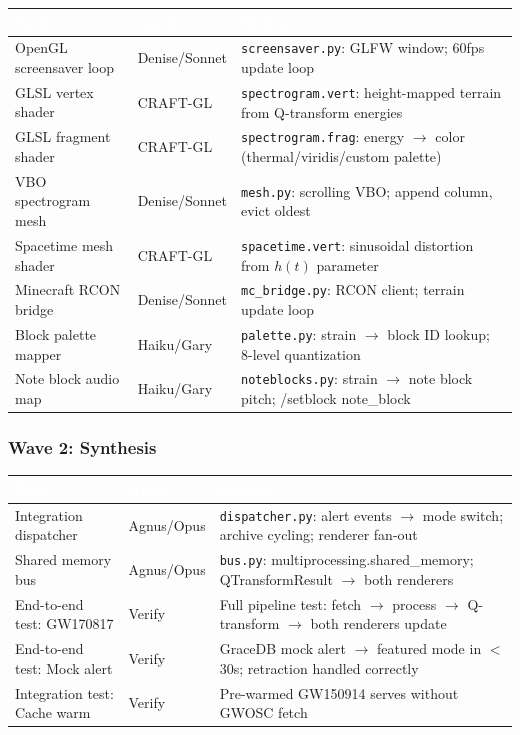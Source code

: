 \documentclass[11pt,letterpaper]{article}
\newcommand{\tableheader}[1]{\textbf{\sffamily\textcolor{white}{#1}}}
\begin{document}
\begin{center}
\begin{tabularx}{\textwidth}{L{3.5cm}L{2cm}X}
\toprule
{}
\tableheader{Task} & \tableheader{Agent} & \tableheader{Output} \\
\midrule
OpenGL screensaver loop & Denise/Sonnet & \texttt{screensaver.py}: GLFW window; 60fps update loop \\
GLSL vertex shader & CRAFT-GL & \texttt{spectrogram.vert}: height-mapped terrain from Q-transform energies \\
GLSL fragment shader & CRAFT-GL & \texttt{spectrogram.frag}: energy $\to$ color (thermal/viridis/custom palette) \\
VBO spectrogram mesh & Denise/Sonnet & \texttt{mesh.py}: scrolling VBO; append column, evict oldest \\
Spacetime mesh shader & CRAFT-GL & \texttt{spacetime.vert}: sinusoidal distortion from $h(t)$ parameter \\
Minecraft RCON bridge & Denise/Sonnet & \texttt{mc\_bridge.py}: RCON client; terrain update loop \\
Block palette mapper & Haiku/Gary & \texttt{palette.py}: strain $\to$ block ID lookup; 8-level quantization \\
Note block audio map & Haiku/Gary & \texttt{noteblocks.py}: strain $\to$ note block pitch; /setblock note\_block \\
\bottomrule
\end{tabularx}
\end{center}

\subsubsection{Wave 2: Synthesis}

\begin{center}
\begin{tabularx}{\textwidth}{L{3.5cm}L{2cm}X}
\toprule
{}
\tableheader{Task} & \tableheader{Agent} & \tableheader{Output} \\
\midrule
Integration dispatcher & Agnus/Opus & \texttt{dispatcher.py}: alert events $\to$ mode switch; archive cycling; renderer fan-out \\
Shared memory bus & Agnus/Opus & \texttt{bus.py}: multiprocessing.shared\_memory; QTransformResult $\to$ both renderers \\
End-to-end test: GW170817 & Verify & Full pipeline test: fetch $\to$ process $\to$ Q-transform $\to$ both renderers update \\
End-to-end test: Mock alert & Verify & GraceDB mock alert $\to$ featured mode in $<$30s; retraction handled correctly \\
Integration test: Cache warm & Verify & Pre-warmed GW150914 serves without GWOSC fetch \\
\bottomrule
\end{tabularx}
\end{center}
\end{document}
